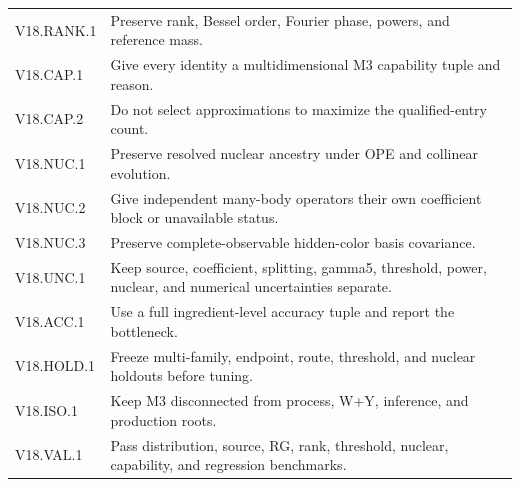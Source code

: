 \documentclass[11pt]{article}
\begin{document}
\begin{longtable}{L{0.18\textwidth}L{0.74\textwidth}}
V18.RANK.1 & Preserve rank, Bessel order, Fourier phase, powers, and reference mass.\\
V18.CAP.1 & Give every identity a multidimensional M3 capability tuple and reason.\\
V18.CAP.2 & Do not select approximations to maximize the qualified-entry count.\\
V18.NUC.1 & Preserve resolved nuclear ancestry under OPE and collinear evolution.\\
V18.NUC.2 & Give independent many-body operators their own coefficient block or unavailable status.\\
V18.NUC.3 & Preserve complete-observable hidden-color basis covariance.\\
V18.UNC.1 & Keep source, coefficient, splitting, gamma5, threshold, power, nuclear, and numerical uncertainties separate.\\
V18.ACC.1 & Use a full ingredient-level accuracy tuple and report the bottleneck.\\
V18.HOLD.1 & Freeze multi-family, endpoint, route, threshold, and nuclear holdouts before tuning.\\
V18.ISO.1 & Keep M3 disconnected from process, W+Y, inference, and production roots.\\
V18.VAL.1 & Pass distribution, source, RG, rank, threshold, nuclear, capability, and regression benchmarks.\\
\bottomrule
\end{longtable}
\normalsize
\end{document}
